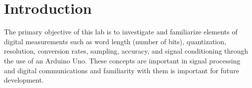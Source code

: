 \section{Introduction}

\noindent The primary objective of this lab is to investigate and familiarize elements of digital measurements such as 
word length (number of bits), quantization, resolution, conversion rates, sampling, accuracy, and signal conditioning through the use of an Arduino Uno. 
These concepts are important in signal processing and digital communications and familiarity with them is important for future development.


